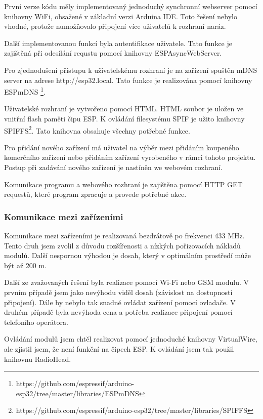 \documentclass[11pt,a4paper,twoside,openright]{report}
\begin{document}
První verze kódu měly implementovaný jednoduchý synchronní webserver pomocí knihovny WiFi, obsažené v základní verzi Arduina IDE. Toto řešení nebylo vhodné, protože numožňovalo připojení více uživatelů k rozhraní naráz.


Další implementovanou funkcí byla autentifikace uživatele. Tato funkce je zajištěná při odesílání requstu pomocí knihovny ESPAsyncWebServer.


Pro zjednodušení přístupu k uživatelskému rozhraní je na zařízení spuštěn mDNS server na adrese http://esp32.local. Tato funkce je realizována pomocí knihovny ESPmDNS \footnote{https://github.com/espressif/arduino-esp32/tree/master/libraries/ESPmDNS}.


Uživatelské rozhraní je vytvořeno pomocí HTML. HTML soubor je uložen ve vnitřní flash paměti čipu ESP. K ovládání filesystému SPIF je užito knihovny SPIFFS\footnote{https://github.com/espressif/arduino-esp32/tree/master/libraries/SPIFFS}. Tato knihovna obsahuje všechny potřebné funkce.


Pro přidání nového zařízení má uživatel na výběr mezi přidáním koupeného komerčního zařízení nebo přidáním zařízení vyrobeného v rámci tohoto projektu. Postup při zadávání nového zařízení je nastíněn we webovém rozhraní.


Komunikace programu a webového rozhraní je zajištěna pomocí HTTP GET requestů, které program zpracuje a provede potřebné akce. 


\subsubsection{Komunikace mezi zařízeními}

Komunikace mezi zařízeními je realizovaná bezdrátově po frekvenci 433 MHz. Tento druh jsem zvolil z důvodu rozšířenosti a nízkých pořizovacích nákladů modulů. Další nespornou výhodou je dosah, který v optimálním prostředí může být až 200 m.


Další ze zvažovaných řešení byla realizace pomocí Wi-Fi nebo GSM modulu. V prvním případě jsem jako nevýhodu viděl dosah (závislost na dostupnosti připojení). Dále by nebylo tak snadné ovládat zařízení pomocí ovladače. V druhém případě byla nevýhoda cena a potřeba realizace připojení pomocí telefoního operátora.


Ovládání modulů jsem chtěl realizovat pomocí jednoduché knihovny VirtualWire, ale zjistil jsem, že není funkční na čipech ESP. K ovládání jsem tak použil knihovnu RadioHead. 
\end{document}
